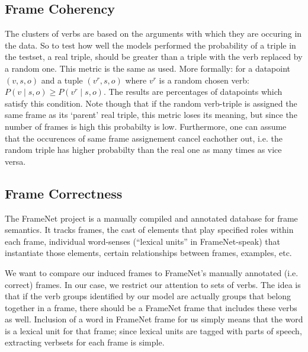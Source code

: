 \documentclass{article} %
\begin{document}
\subsection{Frame Coherency}
The clusters of verbs are based on the arguments with which they are occuring in the data. So to test how well the models performed the probability of a triple in the testset, a real triple, should be greater than a triple with the verb replaced by a random one. This metric is the same as \citeauthor{rooth1999} used. More formally: for a datapoint $(v,s,o)$ and a tuple $(v^r,s,o)$ where $v^r$ is a random chosen verb: $P(v\mid s,o) \geq P(v^r\mid s,o)$.
The results are percentages of datapoints which satisfy this condition. Note though that if the random verb-triple is assigned the same frame as its `parent' real triple, this metric loses its meaning, but since the number of frames is high this probabilty is low. Furthermore, one can assume that the occurences of same frame assignement cancel eachother out, i.e. the random triple has higher probabilty than the real one as many times as vice versa.

\subsection{Frame Correctness}


The FrameNet project is a manually compiled and annotated database for frame semantics. It tracks frames, the cast of elements that play specified roles within each frame, individual word-senses (``lexical units'' in FrameNet-speak) that instantiate those elements, certain relationships between frames, examples, etc. 

We want to compare our induced frames to FrameNet's manually annotated (i.e. correct) frames.
In our case, we restrict our attention to sets of verbs.
The idea is that if the verb groups identified by our model are actually groups that belong together in a frame, there should be a FrameNet frame that includes these verbs as well. Inclusion of a word in FrameNet frame for us simply means that the word is a lexical unit for that frame; since lexical units are tagged with parts of speech, extracting verbsets for each frame is simple.
\end{document}
